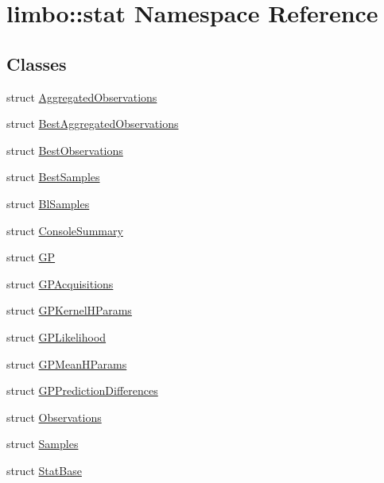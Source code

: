 \hypertarget{namespacelimbo_1_1stat}{}\section{limbo\+:\+:stat Namespace Reference}
\label{namespacelimbo_1_1stat}
\subsection*{Classes}
\begin{DoxyCompactItemize}
\item 
struct \hyperlink{structlimbo_1_1stat_1_1_aggregated_observations}{Aggregated\+Observations}
\item 
struct \hyperlink{structlimbo_1_1stat_1_1_best_aggregated_observations}{Best\+Aggregated\+Observations}
\item 
struct \hyperlink{structlimbo_1_1stat_1_1_best_observations}{Best\+Observations}
\item 
struct \hyperlink{structlimbo_1_1stat_1_1_best_samples}{Best\+Samples}
\item 
struct \hyperlink{structlimbo_1_1stat_1_1_bl_samples}{Bl\+Samples}
\item 
struct \hyperlink{structlimbo_1_1stat_1_1_console_summary}{Console\+Summary}
\item 
struct \hyperlink{structlimbo_1_1stat_1_1_g_p}{G\+P}
\item 
struct \hyperlink{structlimbo_1_1stat_1_1_g_p_acquisitions}{G\+P\+Acquisitions}
\item 
struct \hyperlink{structlimbo_1_1stat_1_1_g_p_kernel_h_params}{G\+P\+Kernel\+H\+Params}
\item 
struct \hyperlink{structlimbo_1_1stat_1_1_g_p_likelihood}{G\+P\+Likelihood}
\item 
struct \hyperlink{structlimbo_1_1stat_1_1_g_p_mean_h_params}{G\+P\+Mean\+H\+Params}
\item 
struct \hyperlink{structlimbo_1_1stat_1_1_g_p_prediction_differences}{G\+P\+Prediction\+Differences}
\item 
struct \hyperlink{structlimbo_1_1stat_1_1_observations}{Observations}
\item 
struct \hyperlink{structlimbo_1_1stat_1_1_samples}{Samples}
\item 
struct \hyperlink{structlimbo_1_1stat_1_1_stat_base}{Stat\+Base}
\end{DoxyCompactItemize}
